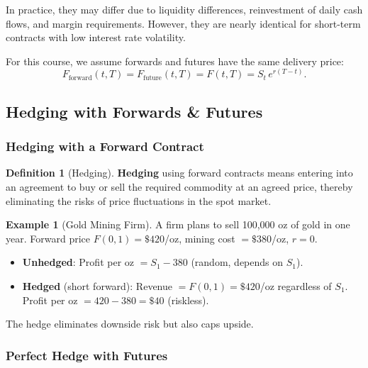 \documentclass[12pt, a4paper]{article}
\theoremstyle{plain}
\theoremstyle{definition}
\newtheorem{definition}[theorem]{Definition}
\newtheorem{example}[theorem]{Example}
\theoremstyle{remark}
\newenvironment{sidenote}{%
  \par\vspace{0.5em}%
  \noindent\color{defcolor}%
}{%
  \par\vspace{0.5em}%
  \color{black}%
}
\begin{document}
\begin{sidenote}
  In practice, they may differ due to liquidity differences, reinvestment of daily cash flows, and margin requirements. However, they are nearly identical for short-term contracts with low interest rate volatility.
\end{sidenote}

\begin{sidenote}
  For this course, we assume forwards and futures have the same delivery price:
  \[
    F_{\text{forward}}(t,T) = F_{\text{future}}(t,T) = F(t,T) = S_t\,e^{r(T-t)}.
  \]
\end{sidenote}

\subsection{Hedging with Forwards \& Futures}

\subsubsection{Hedging with a Forward Contract}

\begin{definition}[Hedging]
  \textbf{Hedging} using forward contracts means entering into an agreement to buy or sell the required commodity at an agreed price, thereby eliminating the risks of price fluctuations in the spot market.
\end{definition}

\begin{example}[Gold Mining Firm]
  A firm plans to sell 100{,}000 oz of gold in one year. Forward price $F(0,1) = \$420$/oz, mining cost $= \$380$/oz, $r=0$.

  \begin{itemize}
    \item \textbf{Unhedged}: Profit per oz $= S_1 - 380$ (random, depends on $S_1$).
    \item \textbf{Hedged} (short forward): Revenue $= F(0,1) = \$420$/oz regardless of $S_1$.
    Profit per oz $= 420 - 380 = \$40$ (riskless).
  \end{itemize}

  The hedge eliminates downside risk but also caps upside.
\end{example}

\subsubsection{Perfect Hedge with Futures}
\end{document}
